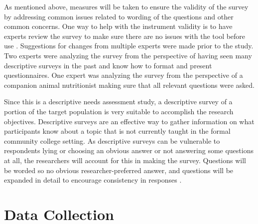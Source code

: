 As mentioned above, measures will be taken to ensure the validity of the survey by addressing common issues related to wording of the questions and other common concerns.  One way to help with the instrument validity is to have experts review the survey to make sure there are no issues with the tool before use \citep{ary}. Suggestions for changes from multiple experts were made prior to the study. Two experts were analyzing the survey from the perspective of having seen many descriptive surveys in the past and know how to format and present questionnaires. One expert was analyzing the survey from the perspective of a companion animal nutritionist making sure that all relevant questions were asked.
\par Since this is a descriptive needs assessment study, a descriptive survey of a portion of the target population is very suitable to accomplish the research objectives.  Descriptive surveys are an effective way to gather information on what participants know about a topic that is not currently taught in the formal community college setting.  As descriptive surveys can be vulnerable to respondents lying or choosing an obvious answer or not answering some questions at all, the researchers will account for this in making the survey.  Questions will be worded so no obvious researcher-preferred answer, and questions will be expanded in detail to encourage consistency in responses \citep{ary}.


\section{Data Collection}

